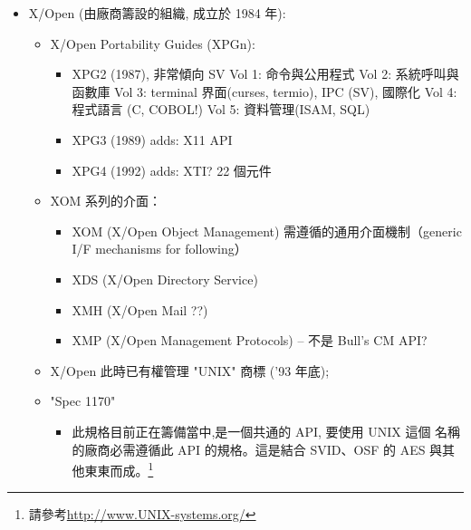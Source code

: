 \documentclass{article}
\begin{document}
\begin{CJK*}{Bg5}{ming}
\begin{itemize}
      \item X/Open (由廠商籌設的組織, 成立於 1984 年):
      \begin{itemize}
        \item X/Open Portability Guides (XPGn):
	\begin{itemize}
          \item XPG2 (1987), 非常傾向 SV
            Vol 1:  命令與公用程式
            Vol 2:  系統呼叫與函數庫
            Vol 3:  terminal 界面(curses, termio), IPC (SV),
                    國際化
            Vol 4:  程式語言 (C, COBOL!)
            Vol 5:  資料管理(ISAM, SQL)
          \item XPG3 (1989) adds: X11 API
          \item XPG4 (1992) adds: XTI? 22 個元件
	\end{itemize}
        \item XOM 系列的介面：
	\begin{itemize}
          \item XOM (X/Open Object Management) 需遵循的通用介面機制（generic
            I/F mechanisms for following）
          \item XDS (X/Open Directory Service)
          \item XMH (X/Open Mail ??)
          \item XMP (X/Open Management Protocols) -- 不是 Bull's CM API?
	\end{itemize}
        \item X/Open 此時已有權管理 "UNIX" 商標 ('93 年底);
        \item "Spec 1170"
	\begin{itemize}
          \item 此規格目前正在籌備當中,是一個共通的 API, 要使用 UNIX 這個
            名稱的廠商必需遵循此 API 的規格。這是結合 SVID、OSF 的 AES
            與其他東東而成。\footnote{請參考\url{http://www.UNIX-systems.org/}}
	\end{itemize}
      \end{itemize}


\end{itemize}
\end{CJK*}
\end{document}
